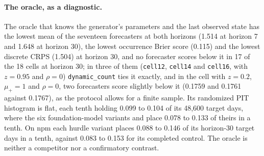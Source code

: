 \paragraph{The oracle, as a diagnostic.} The oracle that knows the generator's parameters and the last
observed state has the lowest mean \qs{} of the seventeen forecasters at both horizons (1.514 at horizon 7
and 1.648 at horizon 30), the lowest occurrence Brier score (0.115) and the lowest discrete CRPS (1.504) at
horizon 30, and no forecaster scores below it in 17 of the 18 cells at horizon 30; in three of them
(\texttt{cell12}, \texttt{cell14} and \texttt{cell16}, with $z = 0.95$ and $\rho = 0$) \texttt{dynamic\_count}
ties it exactly, and in the cell with $z = 0.2$, $\mu_{+} = 1$ and $\rho = 0$, two forecasters score slightly
below it (0.1759 and 0.1761 against 0.1767), as the protocol allows for a finite sample. Its randomized PIT
histogram is flat, each tenth holding 0.099 to 0.104 of its 48,600 target days, where the six
foundation-model variants and \hc{} place 0.078 to 0.133 of theirs in a tenth. On npm each hurdle variant
places 0.088 to 0.146 of its horizon-30 target days in a tenth, against 0.083 to 0.153 for its completed
control. The oracle is neither a competitor nor a confirmatory contrast.

